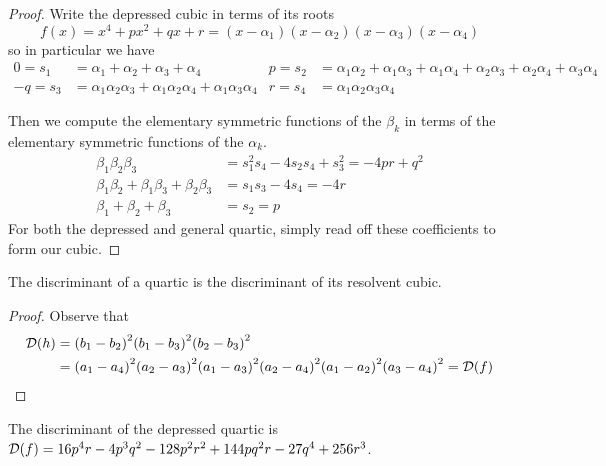 \begin{proof}
    Write the depressed cubic in terms of its roots
    \[f(x) = x^4 + px^2 + qx + r = (x-\alpha_1)(x-\alpha_2)(x-\alpha_3)(x-\alpha_4)\]
    so in particular we have
    \begin{align*}
        0 = s_1 &= \alpha_1 + \alpha_2 + \alpha_3 + \alpha_4 &
        p = s_2 &= \alpha_1\alpha_2 + \alpha_1\alpha_3 + \alpha_1\alpha_4 + \alpha_2\alpha_3 + \alpha_2\alpha_4 + \alpha_3\alpha_4 \\
        -q = s_3 &= \alpha_1\alpha_2\alpha_3 + \alpha_1\alpha_2\alpha_4 + \alpha_1\alpha_3\alpha_4 &
        r = s_4 &= \alpha_1\alpha_2\alpha_3\alpha_4
    \end{align*}

    Then we compute the elementary symmetric functions of the \(\beta_k\)
    in terms of the elementary symmetric functions of the \(\alpha_k\).
    \begin{align*}
        \beta_1\beta_2\beta_3 &= s_1^2s_4 - 4s_2s_4 + s_3^2 = -4pr + q^2 \\
        \beta_1\beta_2 + \beta_1\beta_3 + \beta_2\beta_3 &= s_1s_3 - 4s_4 = -4r \\
        \beta_1 + \beta_2 + \beta_3 &= s_2 = p
    \end{align*}
    For both the depressed and general quartic, simply read off these coefficients to form our cubic.
\end{proof}
\begin{proposition}
    The discriminant of a quartic is the discriminant of its resolvent cubic.
\end{proposition}
\begin{proof}
    Observe that
    \begin{align*}
        \mca{D}(h) &= \pqty{b_1-b_2}^2\pqty{b_1-b_3}^2\pqty{b_2-b_3}^2 \\
        &= \pqty{a_1-a_4}^2\pqty{a_2-a_3}^2\pqty{a_1-a_3}^2\pqty{a_2-a_4}^2\pqty{a_1-a_2}^2\pqty{a_3-a_4}^2
        = \mca{D}(f)
    \end{align*}
\end{proof}
\begin{corollary}
    The discriminant of the depressed quartic is
    \(\mathcal{D}(f) = 16p^4r - 4p^3q^2 - 128p^2r^2 + 144pq^2r - 27q^4 + 256r^3\).
\end{corollary}

